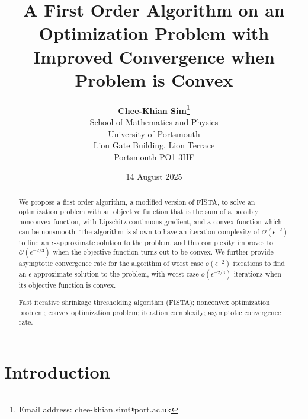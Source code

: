 \documentclass[11pt]{article}
\begin{document}
\title{A First Order Algorithm on an Optimization Problem with Improved Convergence when Problem is Convex }

\author{{\bf{Chee-Khian Sim}}\footnote{Email address:
chee-khian.sim@port.ac.uk}
 \\ School of Mathematics and Physics\\
University of Portsmouth \\ Lion Gate Building, Lion Terrace \\ Portsmouth PO1 3HF
}

\date{14 August 2025}
\maketitle

\begin{abstract}
We propose a first order algorithm, a modified version of FISTA, to solve an optimization problem with an objective function that is the sum of a possibly nonconvex function, with Lipschitz continuous gradient, and a convex function which can be nonsmooth.  The algorithm is shown to have an iteration complexity of $\mathcal{O}(\epsilon^{-2})$ to find an $\epsilon$-approximate solution to the problem, and this complexity improves to $\mathcal{O}(\epsilon^{-2/3})$ when the objective function turns out to be convex.   We further provide asymptotic convergence rate  for the algorithm of worst case $o(\epsilon^{-2})$ iterations to find an $\epsilon$-approximate solution to the problem, with worst case $o(\epsilon^{-2/3})$ iterations  when its objective function is convex.


\vspace{10pt}

Fast iterative shrinkage thresholding algorithm (FISTA); nonconvex optimization problem; convex optimization problem; iteration complexity; asymptotic convergence rate.
\end{abstract}




\section{Introduction}\label{sec:Intro}
\end{document}

